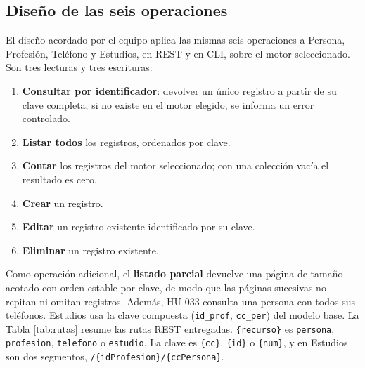 \documentclass[11pt,a4paper]{article}
\begin{document}
\subsection{Diseño de las seis operaciones}
El diseño acordado por el equipo aplica las mismas seis operaciones a Persona,
Profesión, Teléfono y Estudios, en REST y en CLI, sobre el motor seleccionado.
Son tres lecturas y tres escrituras:
\begin{enumerate}
\item \textbf{Consultar por identificador}: devolver un único registro a partir de
su clave completa; si no existe en el motor elegido, se informa un error controlado.
\item \textbf{Listar todos} los registros, ordenados por clave.
\item \textbf{Contar} los registros del motor seleccionado; con una colección vacía
el resultado es cero.
\item \textbf{Crear} un registro.
\item \textbf{Editar} un registro existente identificado por su clave.
\item \textbf{Eliminar} un registro existente.
\end{enumerate}
Como operación adicional, el \textbf{listado parcial} devuelve una página de tamaño
acotado con orden estable por clave, de modo que las páginas sucesivas no repitan
ni omitan registros. Además, HU-033 consulta una persona con todos sus teléfonos.
Estudios usa la clave compuesta (\texttt{id\_prof}, \texttt{cc\_per}) del modelo
base. La Tabla \ref{tab:rutas} resume las rutas REST entregadas.
\texttt{\{recurso\}} es \texttt{persona}, \texttt{profesion}, \texttt{telefono}
o \texttt{estudio}. La clave es \texttt{\{cc\}}, \texttt{\{id\}} o \texttt{\{num\}},
y en Estudios son dos segmentos, \texttt{/\{idProfesion\}/\{ccPersona\}}.
\end{document}
